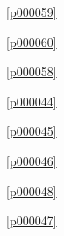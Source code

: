 \noindent\figurename\ \ref{p000059}\dotfill\pageref{p000059}

\noindent\figurename\ \ref{p000060}\dotfill\pageref{p000060}

\noindent\figurename\ \ref{p000058}\dotfill\pageref{p000058}

\noindent\figurename\ \ref{p000044}\dotfill\pageref{p000044}

\noindent\figurename\ \ref{p000045}\dotfill\pageref{p000045}

\noindent\figurename\ \ref{p000046}\dotfill\pageref{p000046}

\noindent\figurename\ \ref{p000048}\dotfill\pageref{p000048}

\noindent\figurename\ \ref{p000047}\dotfill\pageref{p000047}









